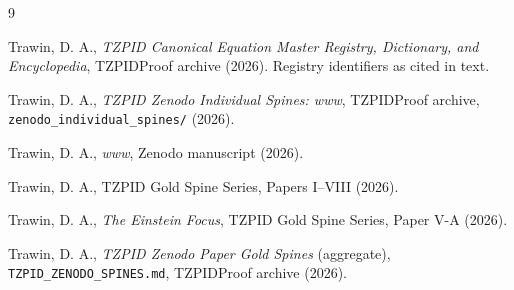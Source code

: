 \documentclass[11pt]{article}
\theoremstyle{remark}
\begin{document}
\begin{thebibliography}{9}

 Trawin, D. A., \emph{TZPID Canonical Equation Master Registry, Dictionary, and Encyclopedia}, TZPIDProof archive (2026). Registry identifiers as cited in text.

 Trawin, D. A., \emph{TZPID Zenodo Individual Spines: www}, TZPIDProof archive, \texttt{zenodo\_individual\_spines/} (2026).

 Trawin, D. A., \emph{www}, Zenodo manuscript (2026).

 Trawin, D. A., TZPID Gold Spine Series, Papers I--VIII (2026).

 Trawin, D. A., \emph{The Einstein Focus}, TZPID Gold Spine Series, Paper V-A (2026).

 Trawin, D. A., \emph{TZPID Zenodo Paper Gold Spines} (aggregate), \texttt{TZPID\_ZENODO\_SPINES.md}, TZPIDProof archive (2026).

\end{thebibliography}
\end{document}
